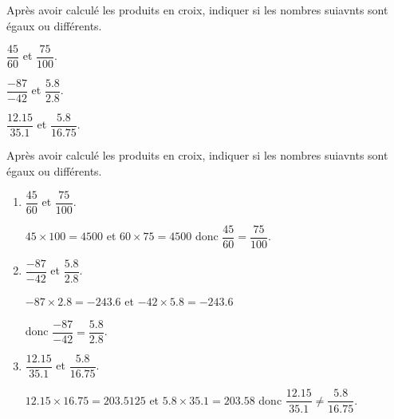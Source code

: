 \begin{exercice*}
    Après avoir calculé les produits en croix, indiquer si les nombres suiavnts sont égaux ou différents.    
    \begin{enumerate}
        \begin{spacing}{2}
            \item $\dfrac{45}{60}$ et $\dfrac{75}{100}$.
            \item $\dfrac{-87}{-42}$ et $\dfrac{\num{5.8}}{\num{2.8}}$.
            \item $\dfrac{\num{12.15}}{\num{35.1}}$ et $\dfrac{\num{5.8}}{\num{16.75}}$.        
        \end{spacing}
    \end{enumerate}
\end{exercice*}
\begin{corrige}
    Après avoir calculé les produits en croix, indiquer si les nombres suiavnts sont égaux ou différents.

    \begin{enumerate}
        \item $\dfrac{45}{60}$ et $\dfrac{75}{100}$.
        
        {\red $45\times 100 = \num{4500}$ et $60\times 75 = \num{4500}$ donc $\dfrac{45}{60}=\dfrac{75}{100}$.}
        \item $\dfrac{-87}{-42}$ et $\dfrac{\num{5.8}}{\num{2.8}}$.
        
        {\red $-87\times\num{2.8}=\num{-243.6}$ et $-42\times\num{5.8}=\num{-243.6}$ 
        
        donc $\dfrac{-87}{-42}=\dfrac{\num{5.8}}{\num{2.8}}$.}
        \item $\dfrac{\num{12.15}}{\num{35.1}}$ et $\dfrac{\num{5.8}}{\num{16.75}}$.        
        
        {\red $\num{12.15}\times\num{16.75}=\num{203.5125}$ et $\num{5.8}\times\num{35.1}=\num{203.58}$ donc $\dfrac{\num{12.15}}{\num{35.1}} \neq \dfrac{\num{5.8}}{\num{16.75}}$.}
    \end{enumerate}
\end{corrige}

